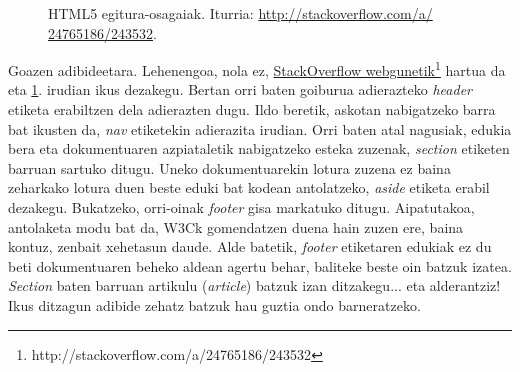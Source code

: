 \begin{figure}[ht]
	\centering
{}
\caption{HTML5 egitura-osagaiak. Iturria: \href{http://stackoverflow.com/a/24765186/243532}{http://stackoverflow.com/a/ 24765186/243532}.}
\label{fig:html5etiketasematikoak}
\end{figure}

Goazen adibideetara. Lehenengoa, nola ez, \href{http://stackoverflow.com/a/24765186/243532}{StackOverflow webgunetik}\footnote{http://stackoverflow.com/a/24765186/243532} hartua da eta \ref{fig:html5etiketasematikoak}. irudian ikus dezakegu. Bertan orri baten goiburua adierazteko \textit{header} etiketa erabiltzen dela adierazten dugu. Ildo beretik, askotan nabigatzeko barra bat ikusten da, \textit{nav} etiketekin adierazita irudian. Orri baten atal nagusiak, edukia bera eta dokumentuaren azpiataletik nabigatzeko esteka zuzenak, \textit{section} etiketen barruan sartuko ditugu. Uneko dokumentuarekin lotura zuzena ez baina zeharkako lotura duen beste eduki bat kodean antolatzeko, \textit{aside} etiketa erabil dezakegu. Bukatzeko, orri-oinak \textit{footer} gisa markatuko ditugu. Aipatutakoa, antolaketa modu bat da, W3Ck gomendatzen duena hain zuzen ere, baina kontuz, zenbait xehetasun daude. Alde batetik, \textit{footer} etiketaren edukiak ez du beti dokumentuaren beheko aldean agertu behar, baliteke beste oin batzuk izatea. \textit{Section} baten barruan artikulu (\textit{article}) batzuk izan ditzakegu... eta alderantziz! Ikus ditzagun adibide zehatz batzuk hau guztia ondo barneratzeko.

